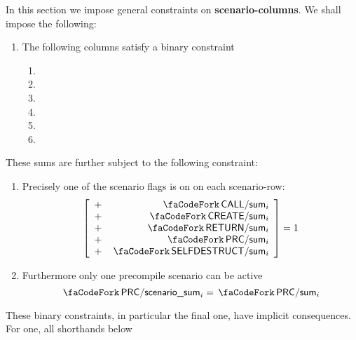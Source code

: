 \begin{center}
\end{center}
In this section we impose general constraints on \textbf{scenario-columns}. We shall impose the following:
\begin{enumerate}
	\item The following columns satisfy a binary constraint \lispDone{}
		\begin{enumerate}
			\item \scenReturnFromMessageCallWillTouchRam{}
			\item \scenReturnFromMessageCallWontTouchRam{}
			\item \scenReturnFromDeploymentEmptyByteCodeWillRevert{}
			\item \scenReturnFromDeploymentEmptyByteCodeWontRevert{}
			\item \scenReturnFromDeploymentNonemptyByteCodeWillRevert{}
			\item \scenReturnFromDeploymentNonemptyByteCodeWontRevert{}
		\end{enumerate}
\end{enumerate}
These sums are further subject to the following constraint: 
\begin{enumerate}[resume]
	\item Precisely one of the scenario flags is on on each scenario-row:
		\[
			\left[ \begin{array}{cr}
				+ & \scenCallSum          _{i} \\
				+ & \scenCreateSum        _{i} \\
				+ & \scenReturnSum        _{i} \\
				+ & \scenPrecompileSum    _{i} \\
				+ & \scenSelfdestructSum  _{i} \\
			\end{array} \right]
			= 1
		\]
	\item Furthermore only one precompile scenario can be active
		\[
			\scenPrcScenarioSum_{i} = \scenPrecompileSum_{i}
		\]
\end{enumerate}
\saNote{} These binary constraints, in particular the final one, have implicit consequences. For one, all shorthands below
